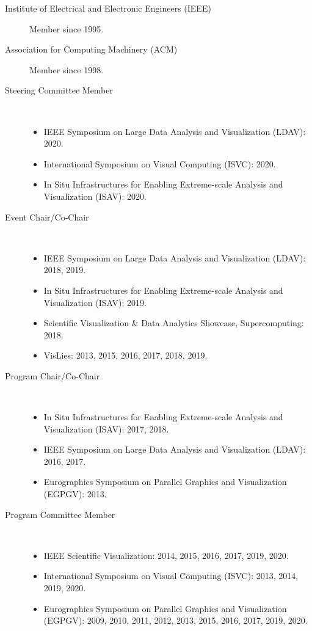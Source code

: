 \documentclass{article}
\begin{document}
\begin{description}
\item[Institute of Electrical and Electronic Engineers (IEEE)]
  Member since 1995.
\item[Association for Computing Machinery (ACM)]  Member since 1998.
\item[Steering Committee Member]~
  \begin{itemize}
  \item
    IEEE Symposium on Large Data Analysis and Visualization (LDAV): 2020.
  \item
    International Symposium on Visual Computing (ISVC): 2020.
  \item
    In Situ Infrastructures for Enabling Extreme-scale Analysis and Visualization (ISAV): 2020.
  \end{itemize}
\item[Event Chair/Co-Chair]~
  \begin{itemize}
  \item
    IEEE Symposium on Large Data Analysis and Visualization (LDAV): 2018, 2019.
  \item
    In Situ Infrastructures for Enabling Extreme-scale Analysis and Visualization (ISAV): 2019.
  \item
    Scientific Visualization \& Data Analytics Showcase, Supercomputing: 2018.
  \item
    VisLies: 2013, 2015, 2016, 2017, 2018, 2019.
  \end{itemize}
\item[Program Chair/Co-Chair]~
  \begin{itemize}
  \item
    In Situ Infrastructures for Enabling Extreme-scale Analysis and Visualization (ISAV): 2017, 2018.
  \item
    IEEE Symposium on Large Data Analysis and Visualization (LDAV): 2016, 2017.
  \item
    Eurographics Symposium on Parallel Graphics and Visualization (EGPGV): 2013.
  \end{itemize}
\item[Program Committee Member]~
  \begin{itemize}
  \item
    IEEE Scientific Visualization: 2014, 2015, 2016, 2017, 2019, 2020.
  \item
    International Symposium on Visual Computing (ISVC): 2013, 2014, 2019, 2020.
  \item
    Eurographics Symposium on Parallel Graphics and Visualization (EGPGV): 2009, 2010, 2011, 2012, 2013, 2015, 2016, 2017, 2019, 2020.

\end{itemize}
\end{description}
\end{document}
